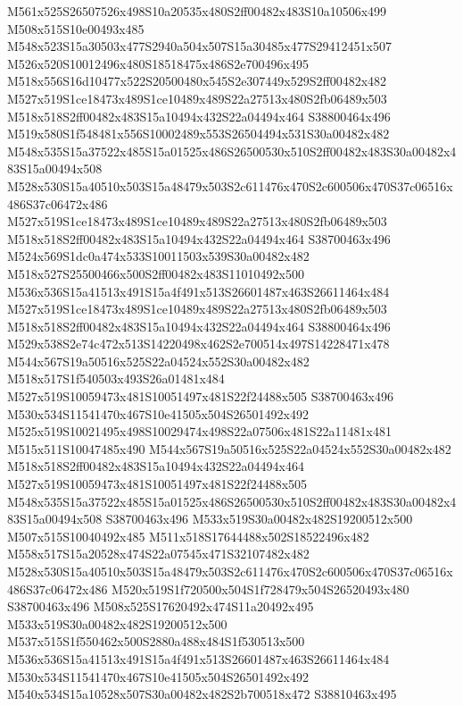 \documentclass{article}
\begin{document}
\begin{multicols}{2}
M561x525S26507526x498S10a20535x480S2ff00482x483S10a10506x499 M508x515S10e00493x485 M548x523S15a30503x477S2940a504x507S15a30485x477S29412451x507 M526x520S10012496x480S18518475x486S2e700496x495 M518x556S16d10477x522S20500480x545S2e307449x529S2ff00482x482 M527x519S1ce18473x489S1ce10489x489S22a27513x480S2fb06489x503 M518x518S2ff00482x483S15a10494x432S22a04494x464 S38800464x496 M519x580S1f548481x556S10002489x553S26504494x531S30a00482x482 M548x535S15a37522x485S15a01525x486S26500530x510S2ff00482x483S30a00482x483S15a00494x508 M528x530S15a40510x503S15a48479x503S2c611476x470S2c600506x470S37c06516x486S37c06472x486 M527x519S1ce18473x489S1ce10489x489S22a27513x480S2fb06489x503 M518x518S2ff00482x483S15a10494x432S22a04494x464 S38700463x496 M524x569S1dc0a474x533S10011503x539S30a00482x482 M518x527S25500466x500S2ff00482x483S11010492x500 M536x536S15a41513x491S15a4f491x513S26601487x463S26611464x484 M527x519S1ce18473x489S1ce10489x489S22a27513x480S2fb06489x503 M518x518S2ff00482x483S15a10494x432S22a04494x464 S38800464x496 M529x538S2e74c472x513S14220498x462S2e700514x497S14228471x478 M544x567S19a50516x525S22a04524x552S30a00482x482 M518x517S1f540503x493S26a01481x484 M527x519S10059473x481S10051497x481S22f24488x505 S38700463x496 M530x534S11541470x467S10e41505x504S26501492x492 M525x519S10021495x498S10029474x498S22a07506x481S22a11481x481 M515x511S10047485x490 M544x567S19a50516x525S22a04524x552S30a00482x482 M518x518S2ff00482x483S15a10494x432S22a04494x464 M527x519S10059473x481S10051497x481S22f24488x505 M548x535S15a37522x485S15a01525x486S26500530x510S2ff00482x483S30a00482x483S15a00494x508 S38700463x496 M533x519S30a00482x482S19200512x500 M507x515S10040492x485 M511x518S17644488x502S18522496x482 M558x517S15a20528x474S22a07545x471S32107482x482 M528x530S15a40510x503S15a48479x503S2c611476x470S2c600506x470S37c06516x486S37c06472x486 M520x519S1f720500x504S1f728479x504S26520493x480 S38700463x496 M508x525S17620492x474S11a20492x495 M533x519S30a00482x482S19200512x500 M537x515S1f550462x500S2880a488x484S1f530513x500 M536x536S15a41513x491S15a4f491x513S26601487x463S26611464x484 M530x534S11541470x467S10e41505x504S26501492x492 M540x534S15a10528x507S30a00482x482S2b700518x472 S38810463x495




\end{multicols}
\end{document}
